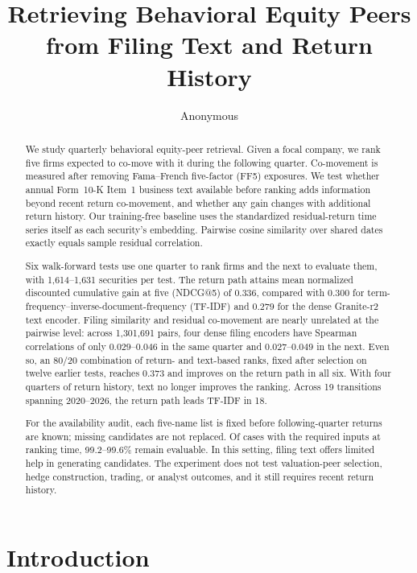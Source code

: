 \documentclass[sigconf,anonymous]{acmart}
\title{Retrieving Behavioral Equity Peers from Filing Text and Return History}
\author{Anonymous}
\affiliation{\institution{Anonymous Institution}}
\begin{document}
\begin{abstract}
We study quarterly behavioral equity-peer retrieval.  Given a focal company,
we rank five firms expected to co-move with it during the following quarter.
Co-movement is measured after removing Fama--French five-factor (FF5) exposures.
We test whether annual Form~10-K Item~1 business text available before ranking
adds information beyond recent return co-movement, and whether any gain changes
with additional return history.  Our training-free baseline uses the standardized
residual-return time series itself as each security's embedding.  Pairwise cosine
similarity over shared dates exactly equals sample residual correlation.

Six walk-forward tests use one quarter to rank firms and the next to evaluate them,
with 1,614--1,631 securities per test.  The return path attains mean normalized
discounted cumulative gain at five (NDCG@5) of $0.336$, compared with $0.300$
for term-frequency--inverse-document-frequency (TF-IDF) and $0.279$ for the
dense Granite-r2 text encoder.  Filing similarity and residual co-movement are
nearly unrelated at the pairwise level: across 1,301,691 pairs, four dense
filing encoders have Spearman correlations of only $0.029$--$0.046$ in the same
quarter and $0.027$--$0.049$ in the next.  Even so, an
80/20 combination of return- and text-based ranks, fixed after selection on
twelve earlier tests, reaches $0.373$ and
improves on the return path in all six.  With four quarters of return history, text no longer improves the
ranking.  Across 19
transitions spanning 2020--2026, the return path leads TF-IDF in 18.

For the availability audit, each five-name list is fixed before following-quarter
returns are known; missing candidates are not replaced.  Of cases with the
required inputs at ranking time, 99.2--99.6\% remain evaluable.  In this
setting, filing text offers limited help in generating candidates.  The
experiment does not test valuation-peer selection, hedge construction, trading,
or analyst outcomes, and it still requires recent return history.
\end{abstract}

\maketitle

\section{Introduction}
\label{sec:intro}
\end{document}
